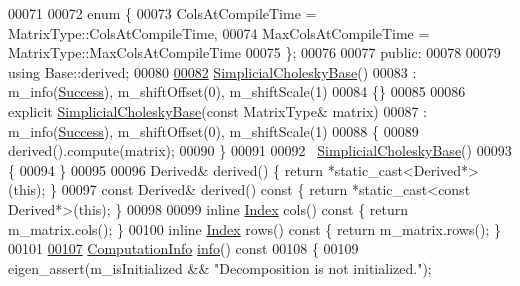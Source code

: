 \begin{DoxyCode}
00071 
00072     \textcolor{keyword}{enum} \{
00073       ColsAtCompileTime = MatrixType::ColsAtCompileTime,
00074       MaxColsAtCompileTime = MatrixType::MaxColsAtCompileTime
00075     \};
00076 
00077   \textcolor{keyword}{public}:
00078     
00079     \textcolor{keyword}{using} Base::derived;
00080 
\hyperlink{group___sparse_cholesky___module_a098baba1dbe07ca3a775c8df1f8a0e71}{00082}     \hyperlink{group___sparse_cholesky___module_a098baba1dbe07ca3a775c8df1f8a0e71}{SimplicialCholeskyBase}()
00083       : m\_info(\hyperlink{group__enums_gga85fad7b87587764e5cf6b513a9e0ee5ea52581b035f4b59c203b8ff999ef5fcea}{Success}), m\_shiftOffset(0), m\_shiftScale(1)
00084     \{\}
00085 
00086     \textcolor{keyword}{explicit} \hyperlink{group___sparse_cholesky___module_class_eigen_1_1_simplicial_cholesky_base}{SimplicialCholeskyBase}(\textcolor{keyword}{const} MatrixType& matrix)
00087       : m\_info(\hyperlink{group__enums_gga85fad7b87587764e5cf6b513a9e0ee5ea52581b035f4b59c203b8ff999ef5fcea}{Success}), m\_shiftOffset(0), m\_shiftScale(1)
00088     \{
00089       derived().compute(matrix);
00090     \}
00091 
00092     ~\hyperlink{group___sparse_cholesky___module_class_eigen_1_1_simplicial_cholesky_base}{SimplicialCholeskyBase}()
00093     \{
00094     \}
00095 
00096     Derived& derived() \{ \textcolor{keywordflow}{return} *\textcolor{keyword}{static\_cast<}Derived*\textcolor{keyword}{>}(\textcolor{keyword}{this}); \}
00097     \textcolor{keyword}{const} Derived& derived()\textcolor{keyword}{ const }\{ \textcolor{keywordflow}{return} *\textcolor{keyword}{static\_cast<}\textcolor{keyword}{const }Derived*\textcolor{keyword}{>}(\textcolor{keyword}{this}); \}
00098     
00099     \textcolor{keyword}{inline} \hyperlink{namespace_eigen_a62e77e0933482dafde8fe197d9a2cfde}{Index} cols()\textcolor{keyword}{ const }\{ \textcolor{keywordflow}{return} m\_matrix.cols(); \}
00100     \textcolor{keyword}{inline} \hyperlink{namespace_eigen_a62e77e0933482dafde8fe197d9a2cfde}{Index} rows()\textcolor{keyword}{ const }\{ \textcolor{keywordflow}{return} m\_matrix.rows(); \}
00101     
\hyperlink{group___sparse_cholesky___module_a3ac877f73aaaff670e6ae7554eb02fc8}{00107}     \hyperlink{group__enums_ga85fad7b87587764e5cf6b513a9e0ee5e}{ComputationInfo} \hyperlink{group___sparse_cholesky___module_a3ac877f73aaaff670e6ae7554eb02fc8}{info}()\textcolor{keyword}{ const}
00108 \textcolor{keyword}{    }\{
00109       eigen\_assert(m\_isInitialized && \textcolor{stringliteral}{"Decomposition is not initialized."});

\end{DoxyCode}
